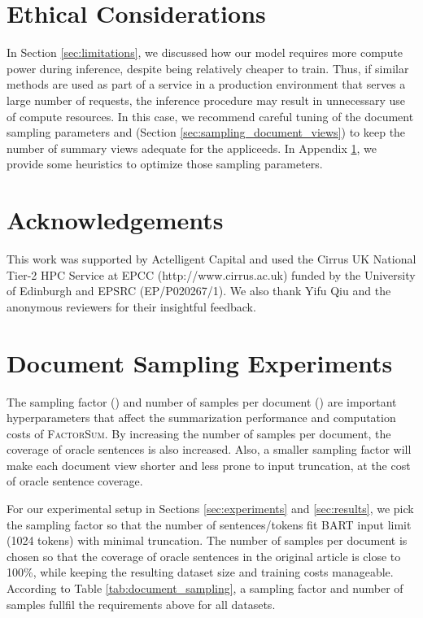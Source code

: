 \documentclass[11pt,table]{article}
\newcommand{\modelname}{FactorSum}
\begin{document}
\section*{Ethical Considerations}
In Section \ref{sec:limitations}, we discussed how our model requires more compute power during inference, despite being relatively cheaper to train. Thus, if similar methods are used as part of a service in a production environment that serves a large number of requests, the inference procedure may result in unnecessary use of compute resources. In this case, we recommend careful tuning of the document sampling parameters  and  (Section \ref{sec:sampling_document_views}) to keep the number of summary views adequate for the appliceeds. In Appendix \ref{sec:document_sampling_details}, we provide some heuristics to optimize those sampling parameters.

\section*{Acknowledgements}
This work was supported by Actelligent Capital and used the Cirrus UK National Tier-2 HPC Service at EPCC (http://www.cirrus.ac.uk) funded by the University of Edinburgh and EPSRC (EP/P020267/1). We also thank Yifu Qiu and the anonymous reviewers for their insightful feedback.



\clearpage
\appendix

\section{Document Sampling Experiments}
\label{sec:document_sampling_details}
The sampling factor () and number of samples per document () are important hyperparameters that affect the summarization performance and computation costs of \textsc{\modelname}. By increasing the number of samples per document, the coverage of oracle sentences is also increased. Also, a smaller sampling factor will make each document view shorter and less prone to input truncation, at the cost of oracle sentence coverage. 

For our experimental setup in Sections \ref{sec:experiments} and \ref{sec:results}, we pick the sampling factor so that the number of sentences/tokens fit BART input limit (1024 tokens) with minimal truncation. The number of samples per document is chosen so that the coverage of oracle sentences in the original article is close to 100\%, while keeping the resulting dataset size and training costs manageable. According to Table \ref{tab:document_sampling}, a sampling factor  and number of samples  fullfil the requirements above for all datasets.
\end{document}
